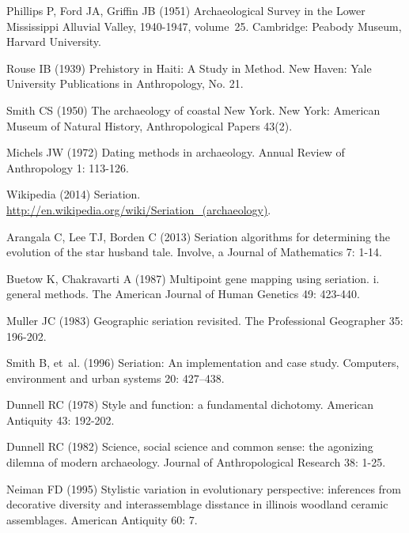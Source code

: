\documentclass[10pt,letterpaper]{article}
\begin{document}
\begin{thebibliography}{10}
Phillips P, Ford JA, Griffin JB (1951) Archaeological Survey in the Lower
  Mississippi Alluvial Valley, 1940-1947, volume~25.
\newblock Cambridge: Peabody Museum, Harvard University.

Rouse IB (1939) Prehistory in Haiti: A Study in Method.
\newblock New Haven: Yale University Publications in Anthropology, No. 21.

Smith CS (1950) The archaeology of coastal New York.
\newblock New York: American Museum of Natural History, Anthropological Papers
  43(2).

Michels JW (1972) Dating methods in archaeology.
\newblock Annual Review of Anthropology 1: 113-126.

Wikipedia (2014) Seriation.
\newblock \urlprefix\url{http://en.wikipedia.org/wiki/Seriation_(archaeology)}.

Arangala C, Lee TJ, Borden C (2013) Seriation algorithms for determining the
  evolution of the star husband tale.
\newblock Involve, a Journal of Mathematics 7: 1-14.

Buetow K, Chakravarti A (1987) Multipoint gene mapping using seriation. i.
  general methods.
\newblock The American Journal of Human Genetics 49: 423-440.

Muller JC (1983) Geographic seriation revisited.
\newblock The Professional Geographer 35: 196-202.

Smith B, et~al. (1996) Seriation: An implementation and case study.
\newblock Computers, environment and urban systems 20: 427--438.

Dunnell RC (1978) Style and function: a fundamental dichotomy.
\newblock American Antiquity 43: 192-202.

Dunnell RC (1982) Science, social science and common sense: the agonizing
  dilemna of modern archaeology.
\newblock Journal of Anthropological Research 38: 1-25.

Neiman FD (1995) Stylistic variation in evolutionary perspective: inferences
  from decorative diversity and interassemblage disstance in illinois woodland
  ceramic assemblages.
\newblock American Antiquity 60: 7.


\end{thebibliography}
\end{document}
